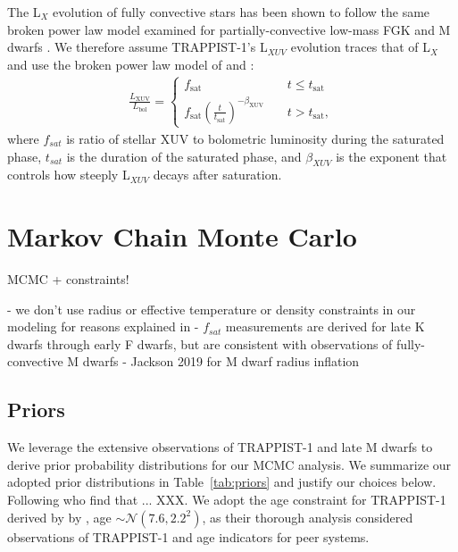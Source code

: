 \documentclass[twocolumn]{aastex62}
\begin{document}
The L$_{X}$ evolution of fully convective stars has been shown to follow the same broken power law model examined for partially-convective low-mass FGK and M dwarfs \citep{Wright2016,Wright2018}. We therefore assume TRAPPIST-1's L$_{XUV}$ evolution traces that of L$_{X}$ and use the broken power law model of \citet{Pizzolato2003} and \citet{Ribas2005}:
\begin{align}
\label{eq:lxuv}
\frac{L_\mathrm{XUV}}{L_\mathrm{bol}} = \left\{
				\begin{array}{lcr}
					f_\mathrm{sat} &\ & t \leq t_\mathrm{sat} \\
					f_\mathrm{sat}\left(\frac{t}{t_\mathrm{sat}}\right)^{-\beta_\mathrm{XUV}} &\ & t > t_\mathrm{sat},
				\end{array}
				\right.
\end{align}
where $f_{sat}$ is ratio of stellar XUV to bolometric luminosity during the saturated phase, $t_{sat}$ is the duration of the saturated phase, and $\beta_{XUV}$ is the exponent that controls how steeply L$_{XUV}$ decays after saturation.


\section{Markov Chain Monte Carlo} \label{sec:mcmc}

MCMC + constraints!

- we don't use radius or effective temperature or density constraints in our modeling for reasons explained in \citet{vanGrootel2018}
-\citet{Jackson2012} $f_{sat}$ measurements are derived for late K dwarfs through early F dwarfs, but are consistent with observations of fully-convective M dwarfs \citep{Wright2018}
- Jackson 2019 for M dwarf radius inflation

\subsection{Priors} \label{sec:mcmc:priors}

We leverage the extensive observations of TRAPPIST-1 and late M dwarfs to derive prior probability distributions for our MCMC analysis. We summarize our adopted prior distributions in Table~\ref{tab:priors} and justify our choices below. Following \citet{vanGrootel2018} who find that ... XXX. We adopt the age constraint for TRAPPIST-1 derived by by \citet{Burgasser2017}, age $\sim \mathcal{N}(7.6, 2.2^2)$, as their thorough analysis considered observations of TRAPPIST-1 and age indicators for peer systems. 
\end{document}

